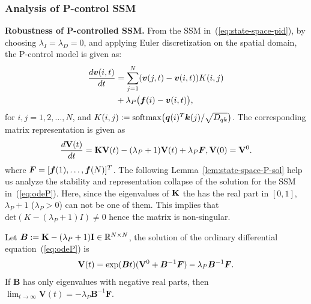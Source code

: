 \subsubsection{Analysis of P-control SSM}
\label{subsec:PD-robust}
\textbf{Robustness of P-controlled SSM.}
From the SSM in~(\ref{eq:state-space-pid}), by choosing $\lambda_I = \lambda_D = 0$, and applying Euler discretization on the spatial domain, the P-control model is given as:
\begin{equation}
   \begin{aligned}
\label{eq:state-space-P}
    \displaystyle \frac{d{\bm v}(i, t)}{dt} &=\displaystyle \sum_{j = 1}^N({\bm v}(j, t) - {\bm v}(i, t))K(i, j) \\
    &+ \lambda_P \bigl({\bm f}(i) -  {\bm v}(i, t)\bigl), 
\end{aligned} 
\end{equation}
for $i,j = 1, 2, \dots, N$, and $K(i,j):= {\rm softmax}\bigl({\bm q}(i)^{T}{\bm k}(j)/\sqrt{D_{qk}}\bigl)$. The corresponding matrix representation is given as
\begin{equation}
\begin{aligned}
    \label{eq:odeP}
    \frac{d{\mathbf V}(t)}{dt} = {\mathbf K}{\mathbf V}(t) - (\lambda_P + 1){\mathbf V}(t) + \lambda_P \bm{F}, {\mathbf V}(0) = {\mathbf V}^0.
\end{aligned}
\end{equation}
where $\bm{F} = [ {\bm f}(1), \dots, {\bm f}(N) ]^T$.
The following Lemma~\ref{lem:state-space-P-sol} help us analyze the stability and representation collapse of the solution for the SSM in~(\ref{eq:odeP}).
Here, since the eigenvalues of ${\mathbf K}$ the has the real part in $[0, 1]$, $\lambda_P + 1$ ($\lambda_P > 0$) can not be one of them. This implies that $\mathrm{det}(K - (\lambda_P + 1)I) \neq 0$ hence the matrix is non-singular.
\begin{lemma}
    \label{lem:state-space-P-sol}
    Let $\bm{B} := {\mathbf K} - (\lambda_P + 1){\mathbf I} \in \mathbb{R}^{N \times N}$, the solution of the ordinary differential equation~(\ref{eq:odeP}) is
    \begin{align}
    \label{eq:state-space-P-sol}
    {\mathbf V}(t) = \mathrm{exp}(\bm{B}t)({\mathbf V}^0 + \bm{B}^{-1}\bm{F}) - \lambda_P\bm{B}^{-1}\bm{F}.
    \end{align} If $\bm{B}$ has only eigenvalues with negative real parts, then $\lim_{t \to \infty}\bm{V}(t) = -\lambda_P\bm{B}^{-1}\bm{F}$.
\end{lemma}
